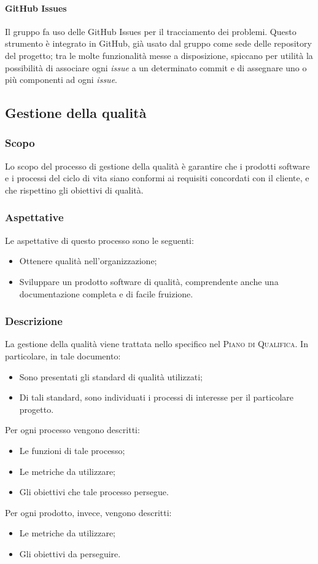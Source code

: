 \documentclass[../norme-di-progetto.tex]{subfiles}
\begin{document}
\paragraph{GitHub Issues}
Il gruppo fa uso delle GitHub Issues per il tracciamento dei problemi. Questo strumento è integrato in GitHub, già usato dal gruppo come sede delle repository del progetto; tra le molte funzionalità messe a disposizione, spiccano per utilità la possibilità di associare ogni \textit{issue} a un determinato commit e di assegnare uno o più componenti ad ogni \textit{issue}.

\subsection{Gestione della qualità}
\subsubsection{Scopo}
Lo scopo del processo di gestione della qualità è garantire che i prodotti software e i processi del ciclo di vita siano conformi ai requisiti concordati con il cliente, e che rispettino gli obiettivi di qualità.
\subsubsection{Aspettative}
Le aspettative di questo processo sono le seguenti:
\begin{itemize}
  \item Ottenere qualità nell'organizzazione;
  \item Sviluppare un prodotto software di qualità, comprendente anche una documentazione completa e di facile fruizione.
\end{itemize}
\subsubsection{Descrizione}
La gestione della qualità viene trattata nello specifico nel \textsc{Piano di Qualifica}. In particolare, in tale documento:
\begin{itemize}
  \item Sono presentati gli standard di qualità utilizzati;
  \item Di tali standard, sono individuati i processi di interesse per il particolare progetto.
\end{itemize}
Per ogni processo vengono descritti:
\begin{itemize}
  \item Le funzioni di tale processo;
  \item Le metriche da utilizzare;
  \item Gli obiettivi che tale processo persegue.
\end{itemize}
Per ogni prodotto, invece, vengono descritti:
\begin{itemize}
  \item Le metriche da utilizzare;
  \item Gli obiettivi da perseguire.
\end{itemize}
\end{document}
